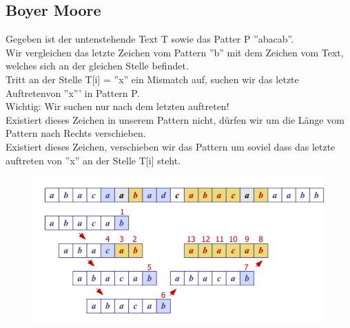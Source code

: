 \documentclass[a4paper,10pt]{report}
\begin{document}
\subsection{Boyer Moore}
Gegeben ist der untenstehende Text T sowie das Patter P ''abacab''.\\
Wir vergleichen das letzte Zeichen vom Pattern ''b'' mit dem Zeichen vom Text, welches sich an der gleichen Stelle befindet.\\
Tritt an der Stelle T[i] = ''x'' ein Mismatch auf, suchen wir das letzte Auftretenvon ''x''' in Pattern P.\\
Wichtig: Wir suchen nur nach dem letzten auftreten!\\
Existiert dieses Zeichen in unserem Pattern nicht, dürfen wir um die Länge vom Pattern nach Rechts verschieben.\\
Existiert dieses Zeichen, verschieben wir das Pattern um soviel dass das letzte auftreten von ''x'' an der Stelle T[i] steht.
\begin{figure}[H]
	\begin{center}
  		\includegraphics[width=\textwidth]{img/boyermoore.png}
	\end{center}
\end{figure}
\noindent
\end{document}

